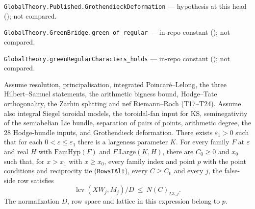 \noindent\nolinkurl{GlobalTheory.Published.GrothendieckDeformation} --- hypothesis at this head (); not compared.\par
\noindent\nolinkurl{GlobalTheory.GreenBridge.green_of_regular} --- in-repo constant (); not compared.\par
\noindent\nolinkurl{GlobalTheory.greenRegularCharacters_holds} --- in-repo constant (); not compared.\par

\begin{formalstatement}\label{sub:T13}

Assume resolution, principalisation, integrated Poincaré--Lelong, the three
Hilbert--Samuel statements, the arithmetic bigness bound, Hodge--Tate
orthogonality, the Zarhin splitting and nef Riemann--Roch (T17--T24).
Assume also integral Siegel toroidal models, the toroidal-fan input for KS,
seminegativity of the semiabelian Lie bundle, separation of pairs of
points, arithmetic degree, the 28 Hodge-bundle inputs, and Grothendieck
deformation. There exists $\varepsilon_1>0$ such that for each
$0<\varepsilon\le\varepsilon_1$ there is a largeness parameter $K$.
For every family $F$ at $\varepsilon$ and real $H$ with
$\mathrm{FamHyp}(F)$ and $F.\mathrm{Large}(K,H)$, there are
$C_0\ge0$ and $x_0$ such that, for $x>x_1$ with $x\ge x_0$, every family
index and point $p$ with the point conditions and reciprocity tie (\nolinkurl{RowsTAlt}), every
$C\ge C_0$ and every $j$, the false-side row satisfies
\[
   \operatorname{lcv}(XW_j,M_j)/D\ \le\ N(C)_{L3,j}.
\]
The normalization $D$, row space and lattice in this expression belong to $p$.

\end{formalstatement}
